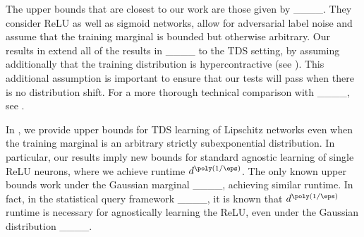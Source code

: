 The upper bounds that are closest to our work are those given by ____. They consider ReLU as well as sigmoid networks, allow for adversarial label noise and assume that the training marginal is bounded but otherwise arbitrary. Our results in  extend all of the results in ____ to the TDS setting, by assuming additionally that the training distribution is hypercontractive (see ). This additional assumption is important to ensure that our tests will pass when there is no distribution shift. For a more thorough technical comparison with ____, see .

In , we provide upper bounds for TDS learning of Lipschitz networks even when the training marginal is an arbitrary strictly subexponential distribution. In particular, our results imply new bounds for standard agnostic learning of single ReLU neurons, where we achieve runtime $d^{\poly({1/\eps})}$. The only known upper bounds work under the Gaussian marginal ____, achieving similar runtime. In fact, in the statistical query  framework ____, it is known that $d^{\poly(1/\eps)}$ runtime is necessary for agnostically learning the ReLU, even under the Gaussian distribution ____. 


